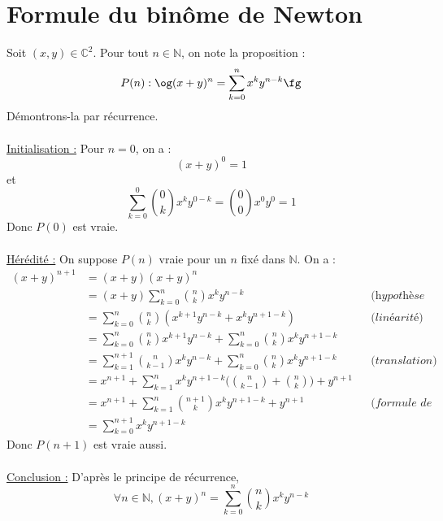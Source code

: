 \documentclass[../main.tex]{subfiles}
\begin{document}
\section{Formule du binôme de Newton}
Soit $(x,y)\in\mathbb{C}^2$. Pour tout $n \in \mathbb{N}$, on note la
proposition :
$$P(n): \text\og(x+y)^n=\sum_{k=0}^{n}x^k y^{n-k}\text\fg$$
Démontrons-la par récurrence.\\
\\
\underline{Initialisation :} Pour $n=0$, on a :
$$(x+y)^0=1$$
et
$$\sum_{k=0}^{0}\binom{0}{k}x^k y^{0-k}=\binom{0}{0}x^0 y^0=1$$
Donc $P(0)$ est vraie.\\
\\
\underline{Hérédité :} On suppose $P(n)$ vraie pour un $n$ fixé dans
$\mathbb N$. On a :
\begin{align*}
  (x+y)^{n+1} & = (x+y)(x+y)^n \\
  & = (x+y)\sum_{k=0}^{n}\binom{n}{k}x^k y^{n-k} &&
  \textit{(hypothèse de récurrence)}\\
  & = \sum_{k=0}^{n}\binom{n}{k}(x^{k+1}y^{n-k}+x^k y^{n+1-k}) &&
  \textit{(linéarité)}\\
  & =
  \sum_{k=0}^{n}\binom{n}{k}x^{k+1}y^{n-k}+\sum_{k=0}^{n}\binom{n}{k}x^k
  y^{n+1-k}\\
  & = \sum_{k=1}^{n+1}\binom{n}{k-1}x^k y^{n-k} +
  \sum_{k=0}^{n}\binom{n}{k}x^k y^{n+1-k} && \textit{(translation)}\\
  & = x^{n+1} + \sum_{k=1}^{n}x^k
  y^{n+1-k}\Bigg(\binom{n}{k-1}+\binom{n}{k}\Bigg)+y^{n+1}\\
  & = x^{n+1} + \sum_{k=1}^{n}\binom{n+1}{k}x^k y^{n+1-k}+y^{n+1} &&
  \textit{(formule de Pascal)}\\
  & = \sum_{k=0}^{n+1}x^k y^{n+1-k}
\end{align*}
Donc $P(n+1)$ est vraie aussi.\\
\\
\underline{Conclusion :} D'après le principe de récurrence,
$$\forall n \in \mathbb{N}, (x+y)^n=\sum_{k=0}^{n}\binom{n}{k}x^k y^{n-k}$$
\end{document}
